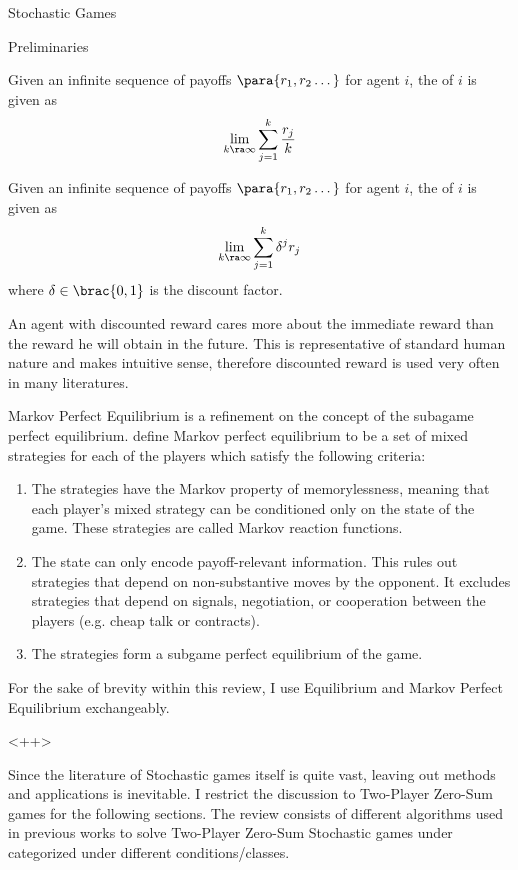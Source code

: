 \documentclass{article}
\begin{document}
\begin{psection}{Stochastic Games}
\begin{psubsection}{Preliminaries}
		\begin{definition}
			Given an infinite sequence of payoffs $\para{r_1, r_2 \dots}$ for agent $i$, the  of $i$ is given as
			\begin{align}
				\lim_{k \ra \infty} \sum_{j = 1}^k \frac{r_j}{k}
				\label{eq:avg-reward}
			\end{align}
		\end{definition}

		\begin{definition}
			Given an infinite sequence of payoffs $\para{r_1, r_2 \dots}$ for agent $i$, the  of $i$ is given as
			\begin{align}
				\lim_{k \ra \infty} \sum_{j = 1}^k \delta^{j} r_j
				\label{eq:dis-reward}
			\end{align}
			where $\delta \in \brac{0, 1}$ is the discount factor.
		\end{definition}

		An agent with discounted reward cares more about the immediate reward than the reward he will obtain in the future. This is representative of standard human nature and makes intuitive sense, therefore discounted reward is used very often in many literatures.

		 Markov Perfect Equilibrium is a refinement on the concept of the subagame perfect equilibrium. \cite{def} define Markov perfect equilibrium to be a set of mixed strategies for each of the players which satisfy the following criteria:

		\begin{enumerate}
			\item The strategies have the Markov property of memorylessness, meaning that each player's mixed strategy can be conditioned only on the state of the game. These strategies are called Markov reaction functions.
			\item The state can only encode payoff-relevant information. This rules out strategies that depend on non-substantive moves by the opponent. It excludes strategies that depend on signals, negotiation, or cooperation between the players (e.g. cheap talk or contracts).
			\item The strategies form a subgame perfect equilibrium of the game.
		\end{enumerate}

		For the sake of brevity within this review, I use Equilibrium and Markov Perfect Equilibrium exchangeably.

	\end{psubsection}

	<++>

	Since the literature of Stochastic games itself is quite vast, leaving out methods and applications is inevitable. I restrict the discussion to Two-Player Zero-Sum games for the following sections. The review consists of different algorithms used in previous works to solve Two-Player Zero-Sum Stochastic games under categorized under different conditions/classes.

\end{psection}
\end{document}
